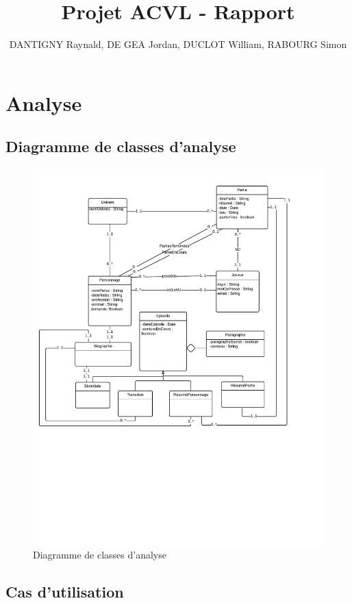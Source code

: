 \documentclass[a4paper,oneside,10pt]{article}
\title{Projet ACVL - Rapport}
\author{DANTIGNY Raynald, DE GEA Jordan, DUCLOT William, RABOURG Simon}
\begin{document}
\maketitle

\tableofcontents


\pagebreak
\section{Analyse}
\subsection{Diagramme de classes d'analyse}
\begin{figure}[H]
\begin{center}
\includegraphics[width=\textwidth]{images/classe/DiagrammeClasse.pdf} 
	\caption{Diagramme de classes d'analyse}
\end{center}
\end{figure}


\pagebreak
\subsection{Cas d'utilisation}
\end{document}
